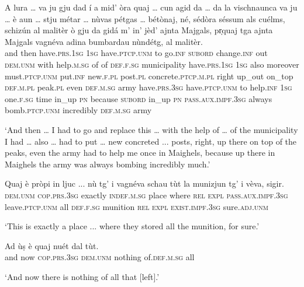 \begin{linenumbers}
\gll  A lura … va ju gju dad í a mid’ òra quaj … cun agid da … da la vischnaunca va ju … è aun … stju métar … nùvas pétgas … bétònaj\footnotemark,  né, sédòra  séssum als cuélms, schizún al malitèr ò gju da gidá m’ in’ jèd’ ajnta Majgals, pr̩quaj tga ajnta Majgals vagnéva adina bumbardau nùndétg, al malitèr.\\
and then {} have.\textsc{prs.1sg} \textsc{1sg} have.\textsc{ptcp.unm} to go.\textsc{inf} \textsc{subord} change.\textsc{inf} out \textsc{dem.unm} {} with help.\textsc{m.sg} of {} of  \textsc{def.f.sg} municipality have.\textsc{prs.1sg} \textsc{1sg} {} also moreover {} must.\textsc{ptcp.unm} put.\textsc{inf} {} new.\textsc{f.pl}  post.\textsc{pl} {} concrete.\textsc{ptcp.m.pl} right up\_out  on\_top \textsc{def.m.pl} peak.\textsc{pl} even \textsc{def.m.sg} army have.\textsc{prs.3sg} have.\textsc{ptcp.unm} to help.\textsc{inf}  \textsc{1sg} one.\textsc{f.sg} time in\_up \textsc{pn} because \textsc{subord} in\_up \textsc{pn} \textsc{pass.aux.impf.3sg} always bomb.\textsc{ptcp.unm} incredibly \textsc{def.m.sg} army \\
\end{linenumbers}
\medskip
\glt `And then … I had to go and replace this … with the help of … of the municipality I had … also … had to put … new concreted ... posts, right, up there on top of the peaks, even the army had to help me once in Maighels, because up there in Maighels the army was always bombing incredibly much.'
\medskip

\begin{linenumbers}
\gll  Quaj è pròpi in ljuc ... nù tg’ i vagnéva schau tùt la munizjun tg’ i vèva, sigir.\\
 \textsc{dem.unm} \textsc{cop.prs.3sg} exactly \textsc{indef.m.sg} place {} where \textsc{rel} \textsc{expl} \textsc{pass.aux.impf.3sg} leave.\textsc{ptcp.unm} all \textsc{def.f.sg} munition \textsc{rel} \textsc{expl} \textsc{exist.impf.3sg} sure.\textsc{adj.unm}\\
\end{linenumbers}
\medskip
\glt `This is exactly a place ... where they stored all the munition, for sure.'
\medskip

\begin{linenumbers}
\gll  Ad ùṣ è quaj nuét dal tùt.\\
and now \textsc{cop.prs.3sg} \textsc{dem.unm} nothing of.\textsc{def.m.sg} all  \\
\end{linenumbers}
\medskip
\glt `And now there is nothing of all that [left].'
\medskip

